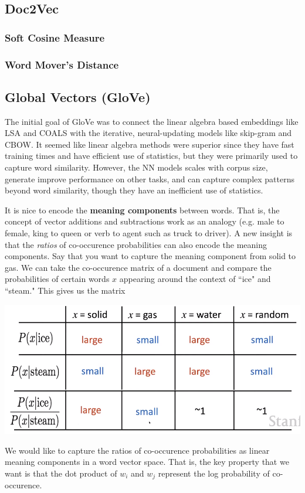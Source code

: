 \documentclass{article}
\begin{document}
  \subsection{Doc2Vec}

    \subsubsection{Soft Cosine Measure}

    \subsubsection{Word Mover's Distance}

  \subsection{Global Vectors (GloVe)}

    The initial goal of GloVe was to connect the linear algebra based embeddings like LSA and COALS with the iterative, neural-updating models like skip-gram and CBOW. It seemed like linear algebra methods were superior since they have fast training times and have efficient use of statistics, but they were primarily used to capture word similarity. However, the NN models scales with corpus size, generate improve performance on other tasks, and can capture complex patterns beyond word similarity, though they have an inefficient use of statistics. 

    It is nice to encode the \textbf{meaning components} between words. That is, the concept of vector additions and subtractions work as an analogy (e.g. male to female, king to queen or verb to agent such as truck to driver). A new insight is that the \textit{ratios} of co-occurence probabilities can also encode the meaning components. Say that you want to capture the meaning component from solid to gas. We can take the co-occurence matrix of a document and compare the probabilities of certain words $x$ appearing around the context of ``ice" and ``steam." This gives us the matrix 
    \begin{center}
        \includegraphics[scale=0.3]{img/solid_gas.png}
    \end{center}
    We would like to capture the ratios of co-occurence probabilities as linear meaning components in a word vector space. That is, the key property that we want is that the dot product of $w_i$ and $w_j$ represent the log probability of co-occurence. 
\end{document}
